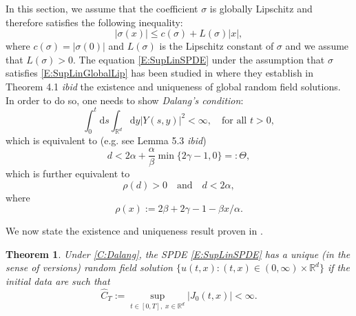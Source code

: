 \documentclass[a4paper,11pt]{article}
\numberwithin{equation}{section}
\theoremstyle{plain}
\newtheorem{theorem}{Theorem}[section]
\theoremstyle{definition}
\newcommand{\ud}{\ensuremath{\mathrm{d} }}
\newcommand{\Norm}[1]{\left\|  #1   \right\|}
\newcommand{\R}{\mathbb{R}}
\numberwithin{NQ}{section}
\numberwithin{LQ}{section}
\numberwithin{ZQ}{section}
\begin{document}
In this section, we assume that the coefficient $\sigma$ is globally Lipschitz and therefore
satisfies the following inequality:
\begin{equation} \label{E:SupLinGlobalLip}
  |\sigma(x)| \le c(\sigma) + L(\sigma)|x|,
\end{equation}
where $c(\sigma) = |\sigma(0)|$ and $L(\sigma)$ is the Lipschitz constant of $\sigma$ and we
assume that $L(\sigma)>0$. The equation \eqref{E:SupLinSPDE} under the assumption that $\sigma$
satisfies \eqref{E:SupLinGlobalLip} has been studied in \cite{chen.hu.ea:19:nonlinear} where they
establish in Theorem 4.1 {\em ibid} the existence and uniqueness of global random field solutions.
In order to do so, one needs to show {\em Dalang's condition}:
\begin{equation} \label{C:Dalang}
  \int_0^t \ud s \int_{\R^d} \ud y |Y(s,y)|^2 < \infty, \quad \text{for all } t>0,
\end{equation}
which is equivalent to (e.g. see Lemma 5.3 {\em ibid})
\begin{equation} \label{E:DalangEquiv}
  d < 2\alpha + \frac{\alpha}{\beta}\min\{2\gamma -1, 0\} =: \Theta,
\end{equation}
which is further equivalent to
\begin{equation} \label{E:DalangEquiv2}
  \rho(d) > 0 \quad \text{and} \quad d < 2\alpha,
\end{equation}
where
\begin{equation} \label{D:rho}
  \rho(x) := 2\beta + 2\gamma -1 -\beta x / \alpha.
\end{equation}

We now state the existence and uniqueness result proven in \cite{chen.hu.ea:19:nonlinear}.

\begin{theorem}{\cite[Theorem 4.1]{chen.hu.ea:19:nonlinear}} \label{T:SolveabilityGenLip}
  Under \eqref{C:Dalang}, the SPDE \eqref{E:SupLinSPDE} has a unique (in the sense of versions)
  random field solution $\{u(t,x) : (t,x) \in (0,\infty) \times \R^d \}$ if the initial data are
  such that
  \begin{equation} \label{E:HomogBdd}
  \widehat{C}_T := \sup_{t\in[0,T],\; x\in \R^d} |J_0(t,x)| < \infty.
  \end{equation}

	\end{theorem}
\end{document}
